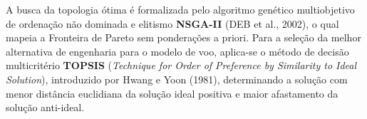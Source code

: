 A busca da topologia ótima é formalizada pelo algoritmo genético multiobjetivo de ordenação não dominada e elitismo \textbf{NSGA-II} (DEB et al., 2002), o qual mapeia a Fronteira de Pareto sem ponderações a priori. Para a seleção da melhor alternativa de engenharia para o modelo de voo, aplica-se o método de decisão multicritério \textbf{TOPSIS} (\textit{Technique for Order of Preference by Similarity to Ideal Solution}), introduzido por Hwang e Yoon (1981), determinando a solução com menor distância euclidiana da solução ideal positiva e maior afastamento da solução anti-ideal.
